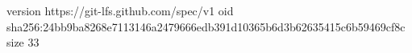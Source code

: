 version https://git-lfs.github.com/spec/v1
oid sha256:24bb9ba8268e7113146a2479666edb391d10365b6d3b62635415c6b59469cf8c
size 33
